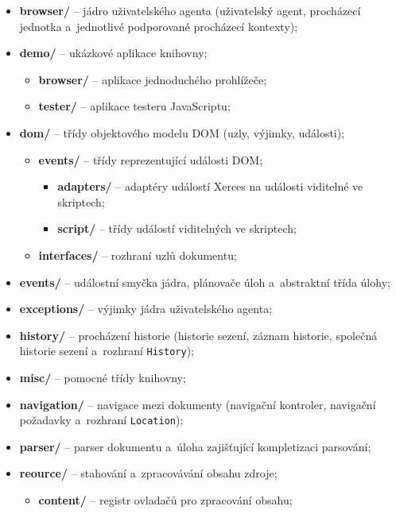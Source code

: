 \begin{itemize}
  \item \textbf{browser/} -- jádro uživatelského agenta (uživatelský agent, procházecí jednotka a~jednotlivé podporované procházecí kontexty);
  \item \textbf{demo/} -- ukázkové aplikace knihovny;
     \begin{itemize}
       \item[] \textbf{browser/} -- aplikace jednoduchého prohlížeče;
       \item[] \textbf{tester/} -- aplikace testeru JavaScriptu;
     \end{itemize}
  \item \textbf{dom/} -- třídy objektového modelu DOM (uzly, výjimky, události);
     \begin{itemize}
       \item[] \textbf{events/} -- třídy reprezentující události DOM;
         \begin{itemize}
           \item[] \textbf{adapters/} -- adaptéry událostí Xerces na události viditelné ve skriptech;
           \item[] \textbf{script/} -- třídy událostí viditelných ve skriptech;
         \end{itemize}
       \item[] \textbf{interfaces/} -- rozhraní uzlů dokumentu;
     \end{itemize}
  \item \textbf{events/} -- událostní smyčka jádra, plánovače úloh a~abstraktní třída úlohy;
  \item \textbf{exceptions/} -- výjimky jádra uživatelského agenta;
  \item \textbf{history/} -- procházení historie (historie sezení, záznam historie, společná historie sezení a~rozhraní \texttt{History});
  \item \textbf{misc/} -- pomocné třídy knihovny;
  \item \textbf{navigation/} -- navigace mezi dokumenty (navigační kontroler, navigační požadavky a~rozhraní \texttt{Location});
  \item \textbf{parser/} -- parser dokumentu a~úloha zajišťující kompletizaci parsování;
  \newpage
  \item \textbf{reource/} -- stahování a~zpracovávání obsahu zdroje;
     \begin{itemize}
       \item[] \textbf{content/} -- registr ovladačů pro zpracování obsahu;

\end{itemize}
\end{itemize}
